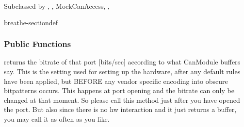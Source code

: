 \documentclass[a4paper,10pt,english]{sphinxmanual}
\begin{document}
\begin{fulllineitems}
\label{\detokenize{canports:_CPPv4N9CanModule10CCanAccessE}}%
\pysigstartmultiline
{}%
\pysigstopmultiline
\sphinxAtStartPar
Subclassed by {\hyperref[\detokenize{classestracing:classAnaCanScan}]{}}, {\hyperref[\detokenize{vendors/systec:classCSockCanScan}]{}}, MockCanAccess, {\hyperref[\detokenize{vendors/peak:classPKCanScan}]{}}, {\hyperref[\detokenize{classestracing:classSTCanScan}]{}}

\begin{sphinxuseclass}{breathe-sectiondef}\subsubsection*{Public Functions}

\begin{fulllineitems}
\label{\detokenize{canports:_CPPv4N9CanModule10CCanAccess14getPortBitrateEv}}%
\pysigstartmultiline
{}%
\pysigstopmultiline
\sphinxAtStartPar
returns the bitrate of that port {[}bits/sec{]} according to what CanModule buffers say. This is the setting used for setting up the hardware, after any default rules have been applied, but BEFORE any vendor specific encoding into obscure bitpatterns occurs. This happens at port opening and the bitrate can only be changed at that moment. So please call this method just after you have opened the port. But also since there is no hw interaction and it just returns a buffer, you may call it as often as you like. 

\end{fulllineitems}


\end{sphinxuseclass}
\end{fulllineitems}
\end{document}
